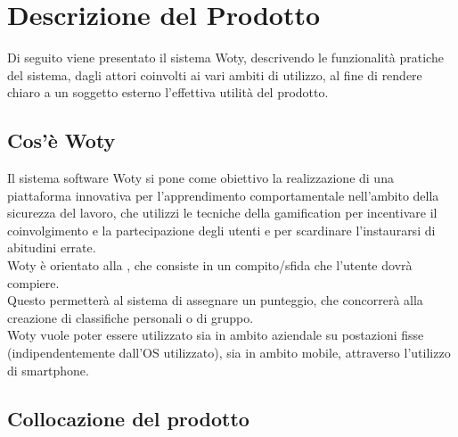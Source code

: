 \listoftables

\listoffigures




\newpage
\chapter{Descrizione del Prodotto}

Di seguito  viene presentato il sistema Woty, descrivendo le funzionalità pratiche del sistema, dagli attori coinvolti ai vari ambiti di utilizzo, al fine di rendere chiaro a un soggetto esterno l'effettiva utilità del prodotto.



\section{Cos'è Woty}

Il sistema software Woty si pone come obiettivo la realizzazione di una piattaforma innovativa per l'apprendimento comportamentale nell'ambito della sicurezza del lavoro, che utilizzi le tecniche della gamification per incentivare il coinvolgimento e la partecipazione degli utenti e per scardinare l'instaurarsi di abitudini errate.\\
Woty è orientato alla , che consiste in un compito/sfida che l'utente dovrà compiere.\\
Questo permetterà al sistema di assegnare un punteggio, che concorrerà alla creazione di classifiche personali o di gruppo.\\
Woty vuole poter essere utilizzato sia in ambito aziendale su postazioni fisse (indipendentemente dall'OS utilizzato), sia in ambito mobile, attraverso l'utilizzo di smartphone.

\section{Collocazione del prodotto}

